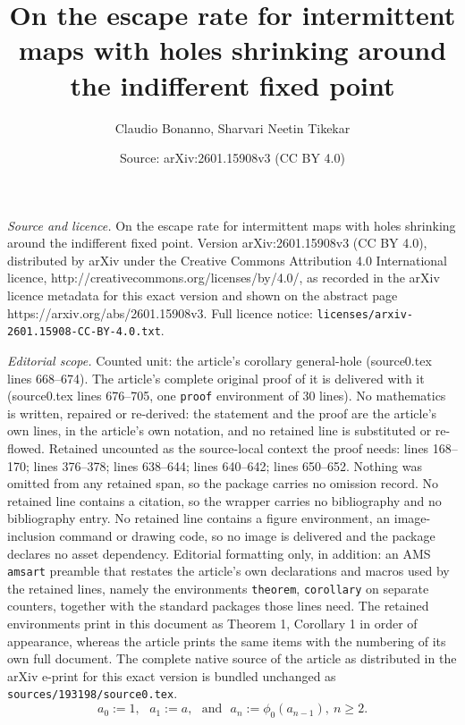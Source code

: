 \documentclass[10pt,a4paper]{amsart}
\title{On the escape rate for intermittent maps with holes shrinking around the indifferent fixed point}
\author{Claudio Bonanno, Sharvari Neetin Tikekar}
\date{Source: arXiv:2601.15908v3 (CC BY 4.0)}
\begin{document}
\maketitle

\noindent\emph{Source and licence.} On the escape rate for intermittent maps with holes shrinking around the indifferent fixed point. Version arXiv:2601.15908v3 (CC BY 4.0), distributed by arXiv under the Creative Commons Attribution 4.0 International licence, http://creativecommons.org/licenses/by/4.0/, as recorded in the arXiv licence metadata for this exact version and shown on the abstract page https://arxiv.org/abs/2601.15908v3. Full licence notice: \texttt{licenses/arxiv-2601.15908-CC-BY-4.0.txt}.\par\smallskip

\noindent\textit{Editorial scope.} Counted unit: the article's corollary general-hole (source0.tex lines 668--674). The article's complete original proof of it is delivered with it (source0.tex lines 676--705, one \texttt{proof} environment of 30 lines). No mathematics is written, repaired or re-derived: the statement and the proof are the article's own lines, in the article's own notation, and no retained line is substituted or re-flowed.  Retained uncounted as the source-local context the proof needs: lines 168--170; lines 376--378; lines 638--644; lines 640--642; lines 650--652.  Nothing was omitted from any retained span, so the package carries no omission record.  No retained line contains a citation, so the wrapper carries no bibliography and no bibliography entry.  No retained line contains a figure environment, an image-inclusion command or drawing code, so no image is delivered and the package declares no asset dependency.  Editorial formatting only, in addition: an AMS \texttt{amsart} preamble that restates the article's own declarations and macros used by the retained lines, namely the environments \texttt{theorem}, \texttt{corollary} on separate counters, together with the standard packages those lines need.  The retained environments print in this document as Theorem 1, Corollary 1 in order of appearance, whereas the article prints the same items with the numbering of its own full document.  The complete native source of the article as distributed in the arXiv e-print for this exact version is bundled unchanged as \texttt{sources/193198/source0.tex}.
\begin{equation} \label{preimages}
        a_{0}:=1, \ \ \ a_{1}:= a, \ \ \ \text{and} \ \ \   a_{n}:=\phi_{0}(a_{n-1}), \  n \ge 2. 
\end{equation} 
\end{document}
